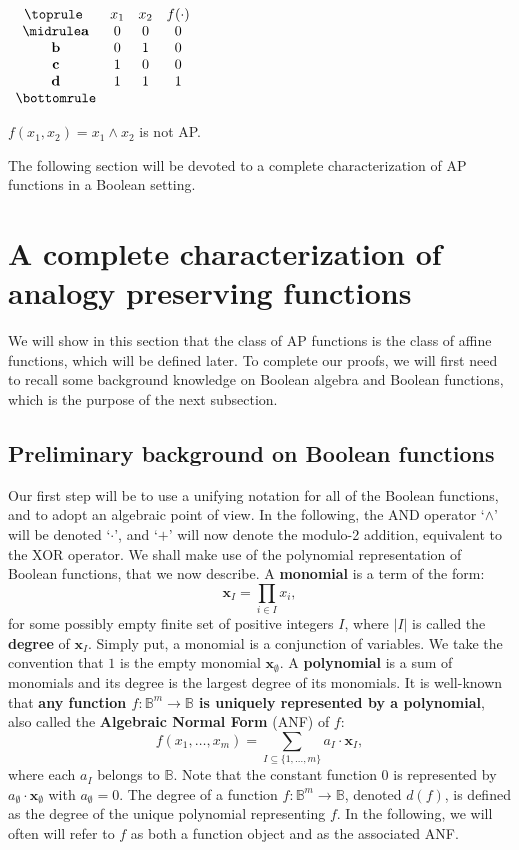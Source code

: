 \begin{table}[ht]
  \center
$\begin{array}{cccc}
  \toprule
  ~ & x_1 & x_2 & f(\cdot) \\
  \midrule
  \mathbf{a} & 0 & 0 & 0\\
  \mathbf{b} & 0 & 1 & 0\\
  \mathbf{c} & 1 & 0 & 0\\
  \mathbf{d} & 1 & 1 & 1\\
  \bottomrule
\end{array}
$\bigskip
\caption{$f(x_1,x_2)= x_1 \wedge x_2$ is not AP.}
\label{exampleNotAP}
\end{table}

The following section will be devoted to a complete characterization of AP
functions in a Boolean setting.

\section{A complete characterization of analogy preserving functions}
\label{SEC:a_complete_characterization_of_AP_functions}

We will show in this section that the class of AP functions is the class of
affine functions, which will be defined later. To complete our proofs, we will
first need to recall some background knowledge on Boolean algebra and Boolean
functions, which is the purpose of the next subsection.

\subsection{Preliminary background on Boolean functions}

Our first step will be to use a unifying notation for all of the Boolean
functions, and to adopt an algebraic point of view.  In the following, the AND
operator `$\wedge$' will be denoted `$\cdot$', and `$+$' will now denote the
modulo-2 addition, equivalent to the XOR operator.  We shall make use of the
polynomial representation of Boolean functions, that we now describe. A
\textbf{ monomial} is a term of the form:
$$\mathbf{x}_I=\underset{i\in I}{\prod}x_i,$$ for some possibly empty finite
set of positive integers $I$, where $|I|$ is called the \textbf{degree} of
$\mathbf{x}_I$. Simply put, a monomial is a conjunction of variables. We take
the convention that $1$ is the empty monomial $\mathbf{x}_\emptyset $. A
\textbf{ polynomial} is a sum of monomials and its degree is the largest degree
of its monomials.  It is well-known \cite{StoneAlgebra36,ZhegalkinAlgebra27}
that \textbf{any function $f:\mathbb{B}^m\rightarrow \mathbb{B}$ is uniquely
represented by a polynomial}, also called the \textbf{Algebraic Normal Form}
(ANF) of $f$:
$$f(x_1,\ldots,x_m)=\sum_{I\subseteq \{1,\ldots,m\}}a_I\cdot \mathbf{x}_I,$$
where each $a_I$ belongs to $\mathbb{B}$. Note that the
constant function $0$ is represented by $a_\emptyset\cdot \mathbf{x}_\emptyset$
with $a_\emptyset =0$. The degree of a function $f:\mathbb{B}^m\rightarrow
\mathbb{B}$, denoted $d(f)$, is defined as the degree of the unique polynomial
representing $f$. In the following, we will often will refer to $f$ as both a
function object and as the associated ANF.

